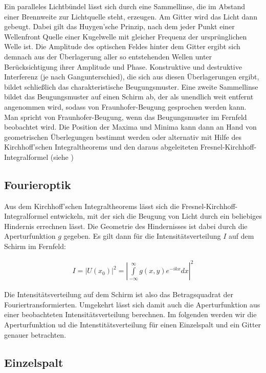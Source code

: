 \documentclass[12pt]{article}
\begin{document}
Ein paralleles Lichtbündel lässt sich durch eine Sammellinse, die im Abstand einer Brennweite zur Lichtquelle steht, erzeugen. Am Gitter wird das Licht dann gebeugt. Dabei gilt das Huygen'sche Prinzip, nach dem jeder Punkt einer Wellenfront Quelle einer Kugelwelle mit gleicher Frequenz der ursprünglichen Welle ist. Die Amplitude des optischen Feldes hinter dem Gitter ergibt sich demnach aus der Überlagerung aller so entstehenden Wellen unter Berücksichtigung ihrer Amplitude und Phase. Konstruktive und destruktive Interferenz (je nach Gangunterschied), die sich aus diesen Überlagerungen ergibt, bildet schließlich das charakteristische Beugungsmuster. Eine zweite Sammellinse bildet das Beugungsmuster auf einen Schirm ab, der als unendlich weit entfernt angenommen wird, sodass von Fraunhofer-Beugung gesprochen werden kann. Man spricht von Fraunhofer-Beugung, wenn das Beugungsmuster im Fernfeld beobachtet wird. Die Position der Maxima und Minima kann dann an Hand von geometrischen Überlegungen bestimmt werden oder alternativ mit Hilfe des Kirchhoff'schen Integraltheorems und den daraus abgeleiteten Fresnel-Kirchhoff-Integralformel (siehe \label{Fourier})

\subsection{Fourieroptik}  

Aus dem  Kirchhoff'schen Integraltheorems lässt sich die Fresnel-Kirchhoff-Integralformel entwickeln, mit der sich die Beugung von Licht durch ein beliebiges Hindernis errechnen lässt. Die Geometrie des Hindernisses ist dabei durch die Aperturfunktion $g$ gegeben. Es gilt dann für die Intensitätsverteilung $I$ auf dem Schirm im Fernfeld: 

\begin{align}
I=|U(x_0)|^2=\left| \int\limits_{-\infty}^{\infty} g(x,y)e^{-ikx}dx \right|^2
\end{align}



Die Intensitätsverteilung auf dem Schirm ist also das Betragsquadrat der Fouriertransformierten. Umgekehrt lässt sich damit auch die Aperturfunktion aus einer beobachteten Intensitätsverteilung berechnen. Im folgenden werden wir die Aperturfunktion ud die Intenstitätsverteilung für einen Einzelspalt und ein Gitter genauer betrachten.

\subsection{Einzelspalt}
       
\end{document}

